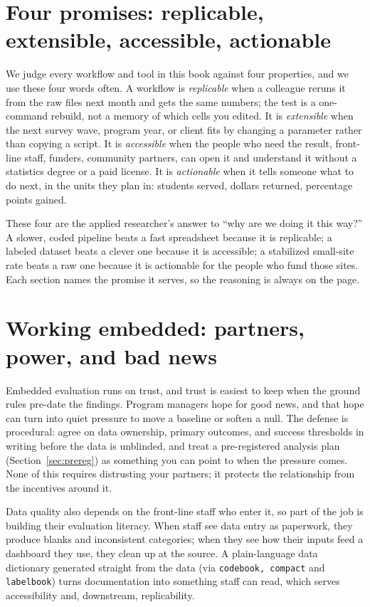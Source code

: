 \documentclass[
    a4paper,
    fontsize=10pt,
    twoside=true,
    numbers=noenddot,
]{kaobook}
\begin{document}
\section{Four promises: replicable, extensible, accessible, actionable}\label{sec:promises}
We judge every workflow and tool in this book against four properties, and we use these four words often. A workflow is \emph{replicable} when a colleague reruns it from the raw files next month and gets the same numbers; the test is a one-command rebuild, not a memory of which cells you edited. It is \emph{extensible} when the next survey wave, program year, or client fits by changing a parameter rather than copying a script. It is \emph{accessible} when the people who need the result, front-line staff, funders, community partners, can open it and understand it without a statistics degree or a paid license. It is \emph{actionable} when it tells someone what to do next, in the units they plan in: students served, dollars returned, percentage points gained.

These four are the applied researcher's answer to \enquote{why are we doing it this way?} A slower, coded pipeline beats a fast spreadsheet because it is replicable; a labeled dataset beats a clever one because it is accessible; a stabilized small-site rate beats a raw one because it is actionable for the people who fund those sites. Each section names the promise it serves, so the reasoning is always on the page.

\section{Working embedded: partners, power, and bad news}\label{sec:literacy}
Embedded evaluation runs on trust, and trust is easiest to keep when the ground rules pre-date the findings. Program managers hope for good news, and that hope can turn into quiet pressure to move a baseline or soften a null. The defense is procedural: agree on data ownership, primary outcomes, and success thresholds in writing before the data is unblinded, and treat a pre-registered analysis plan (Section~\ref{sec:prereg}) as something you can point to when the pressure comes. None of this requires distrusting your partners; it protects the relationship from the incentives around it.

Data quality also depends on the front-line staff who enter it, so part of the job is building their evaluation literacy. When staff see data entry as paperwork, they produce blanks and inconsistent categories; when they see how their inputs feed a dashboard they use, they clean up at the source. A plain-language data dictionary generated straight from the data (via \texttt{codebook, compact} and \texttt{labelbook}) turns documentation into something staff can read, which serves accessibility and, downstream, replicability.
\end{document}
